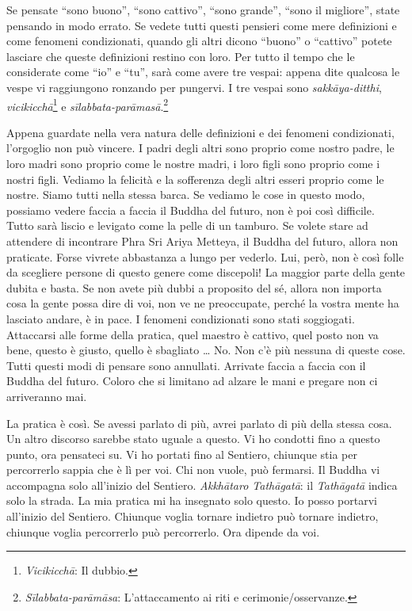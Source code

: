 Se pensate ``sono buono'', ``sono cattivo'', ``sono grande'', ``sono il
migliore'', state pensando in modo errato. Se vedete tutti questi
pensieri come mere definizioni e come fenomeni condizionati, quando gli
altri dicono ``buono'' o ``cattivo'' potete lasciare che queste
definizioni restino con loro. Per tutto il tempo che le considerate come
``io'' e ``tu'', sarà come avere tre vespai: appena dite qualcosa le
vespe vi raggiungono ronzando per pungervi. I tre vespai sono
\emph{sakkāya-ditthi}, \emph{vicikicchā}\footnote{\emph{Vicikicchā}: Il
  dubbio.} e \emph{sīlabbata-parāmasā}.\footnote{\emph{Sīlabbata-parāmāsa}:
  L'attaccamento ai riti e cerimonie/osservanze.}

Appena guardate nella vera natura delle definizioni e dei fenomeni
condizionati, l'orgoglio non può vincere. I padri degli altri sono
proprio come nostro padre, le loro madri sono proprio come le nostre
madri, i loro figli sono proprio come i nostri figli. Vediamo la
felicità e la sofferenza degli altri esseri proprio come le nostre.
Siamo tutti nella stessa barca. Se vediamo le cose in questo modo,
possiamo vedere faccia a faccia il Buddha del futuro, non è poi così
difficile. Tutto sarà liscio e levigato come la pelle di un tamburo. Se
volete stare ad attendere di incontrare Phra Sri Ariya Metteya, il
Buddha del futuro, allora non praticate. Forse vivrete abbastanza a
lungo per vederlo. Lui, però, non è così folle da scegliere persone di
questo genere come discepoli! La maggior parte della gente dubita e
basta. Se non avete più dubbi a proposito del sé, allora non importa
cosa la gente possa dire di voi, non ve ne preoccupate, perché la vostra
mente ha lasciato andare, è in pace. I fenomeni condizionati sono stati
soggiogati. Attaccarsi alle forme della pratica, quel maestro è cattivo,
quel posto non va bene, questo è giusto, quello è sbagliato \ldots{} No. Non
c'è più nessuna di queste cose. Tutti questi modi di pensare sono
annullati. Arrivate faccia a faccia con il Buddha del futuro. Coloro che
si limitano ad alzare le mani e pregare non ci arriveranno mai.

La pratica è così. Se avessi parlato di più, avrei parlato di più della
stessa cosa. Un altro discorso sarebbe stato uguale a questo. Vi ho
condotti fino a questo punto, ora pensateci su. Vi ho portati fino al
Sentiero, chiunque stia per percorrerlo sappia che è lì per voi. Chi non
vuole, può fermarsi. Il Buddha vi accompagna solo all'inizio del
Sentiero. \emph{Akkhātaro Tathāgatā}: il \emph{Tathāgatā} indica solo la
strada. La mia pratica mi ha insegnato solo questo. Io posso portarvi
all'inizio del Sentiero. Chiunque voglia tornare indietro può tornare
indietro, chiunque voglia percorrerlo può percorrerlo. Ora dipende da
voi.

